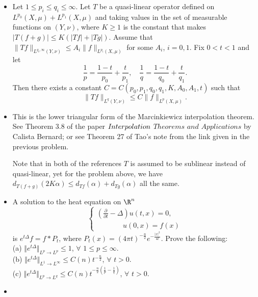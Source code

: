 \begin{itemize}
注：更一般的结论见Tao的课程讲义
\url{https://terrytao.wordpress.com/2009/03/30/245c-notes-1-interpolation-of-lp-spaces/}
的Lemma 43.

\item[2.]
Let $1\leq p_i\leq q_i\leq\infty$. Let $T$ be a quasi-linear operator defined on 
$L^{p_0}(X,\mu)+L^{p_1}(X,\mu)$ and taking values in the set of measurable functions on $(Y,\nu)$, 
where $K\geq1$ is the constant that makes $|T(f+g)|\leq K(|Tf|+|Tg|)$. 
Assume that 
$\|Tf\|_{L^{q_i,\infty}(Y,\nu)}\leq A_i\|f\|_{L^{p_i}(X,\mu)}$ for some $A_i$, $i=0,1$.
Fix $0<t<1$ and let
$$\frac{1}{p}=\frac{1-t}{p_0}+\frac{t}{p_1},\quad\frac{1}{q}=\frac{1-t}{q_0}+\frac{t}{q_1}.$$
Then there exists a constant $C=C(p_0,p_1,q_0,q_1,K,A_0,A_1,t)$ such that
$$\|Tf\|_{L^q(Y,\nu)}\leq C\|f\|_{L^p(X,\mu)}.$$

\item[\textit{Proof:}]

This is the lower triangular form of the Marcinkiewicz interpolation theorem. 
See Theorem 3.8 of the paper $I\hspace{-0.06em}nterpolation$ $Theorems$ $and$ $Applications$ by Calista Bernard; 
or see Theorem 27 of Tao's note from the link given in the previous problem.

Note that in both of the references $T$ is assumed to be sublinear instead of quasi-linear, yet for the problem above, we have 
$d_{T(f+g)}(2K\alpha)\leq d_{Tf}(\alpha)+d_{Tg}(\alpha)$ all the same.

\item[3.]
A solution to the heat equation on $\R^n$
$$\begin{cases}(\frac{\partial}{\partial t}-\Delta)u(t,x)=0,\\
    \qquad\quad\ \ \ u(0,x)=f(x)
\end{cases}$$
is $e^{t\Delta}f= f*P_t$, where $P_t(x)=(4\pi t)^{-\frac{n}2}e^{-\frac{\vert x\vert ^2}{4t}}.$ 
Prove the following:\\
(a) $\Vert e^{t\Delta}\Vert _{L^p\rightarrow L^p}\leq 1$, $\forall$ $1\leq p \leq \infty$.\\
(b) $\Vert e^{t\Delta}\Vert _{L^1\rightarrow L^\infty}\leq C(n)t^{-\frac{n}2}$, $\forall$ $t>0$.\\
(c) $\Vert e^{t\Delta}\Vert _{L^p\rightarrow L^q}\leq C(n)t^{-\frac{n}2(\frac1p-\frac1q)}$, $\forall$ $t>0$.

\item[\textit{Proof:}]


\end{itemize}
